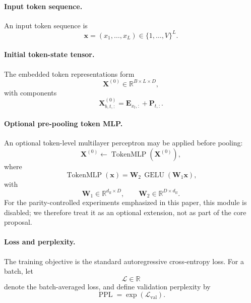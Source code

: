 \documentclass{article}
\theoremstyle{plain}
\theoremstyle{definition}
\theoremstyle{remark}
\begin{document}
\paragraph{Input token sequence.}
An input token sequence is
\begin{equation}
\label{eq:input-sequence}
\mathbf{x}=(x_1,\dots,x_L)\in\{1,\dots,V\}^L.
\end{equation}

\paragraph{Initial token-state tensor.}
The embedded token representations form
\begin{equation}
\label{eq:token-states}
\mathbf{X}^{(0)}\in\mathbb{R}^{B\times L\times D},
\end{equation}
with components
\begin{equation}
\label{eq:token-embedding-lookup}
\mathbf{X}^{(0)}_{b,t,:}=\mathbf{E}_{x_t,:}+\mathbf{P}_{t,:}.
\end{equation}

\paragraph{Optional pre-pooling token MLP.}
An optional token-level multilayer perceptron may be applied before pooling:
\begin{equation}
\label{eq:token-mlp}
\mathbf{X}^{(0)}\leftarrow \operatorname{TokenMLP}(\mathbf{X}^{(0)}),
\end{equation}
where
\begin{equation}
\label{eq:token-mlp-def}
\operatorname{TokenMLP}(\mathbf{x})=\mathbf{W}_2\,\operatorname{GELU}(\mathbf{W}_1\mathbf{x}),
\end{equation}
with
\begin{equation}
\mathbf{W}_1\in\mathbb{R}^{d_{\mathrm{ff}}\times D},
\qquad
\mathbf{W}_2\in\mathbb{R}^{D\times d_{\mathrm{ff}}}.
\end{equation}
For the parity-controlled experiments emphasized in this paper, this module is disabled; we therefore treat it as an optional extension, not as part of the core proposal.

\paragraph{Loss and perplexity.}
The training objective is the standard autoregressive cross-entropy loss. For a batch, let
\begin{equation}
\label{eq:loss}
\mathcal{L}\in\mathbb{R}
\end{equation}
denote the batch-averaged loss, and define validation perplexity by
\begin{equation}
\label{eq:perplexity}
\operatorname{PPL}=\exp(\mathcal{L}_{\mathrm{val}}).
\end{equation}
\end{document}
